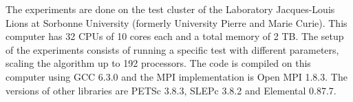 The experiments are done on the test cluster of the Laboratory Jacques-Louis Lions at Sorbonne University (formerly University Pierre and Marie Curie).
This computer has 32 CPUs of 10 cores each and a total memory of 2 TB.
The setup of the experiments consists of running a specific test with different parameters, scaling the algorithm up to 192 processors.
The code is compiled on this computer using GCC 6.3.0 and the MPI implementation is Open MPI 1.8.3.
The versions of other libraries are PETSc 3.8.3, SLEPc 3.8.2 and Elemental 0.87.7.
